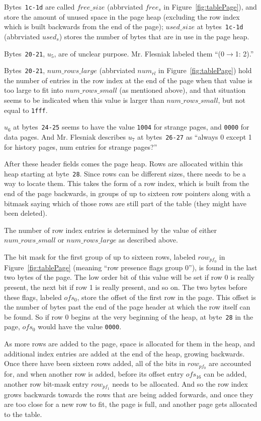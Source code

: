 \documentclass[11pt]{article}
\begin{document}
Bytes~{\tt 1c-1d} are called $free\_size$ (abbrviated $free_s$ in
Figure~\ref{fig:tablePage}), and store the amount of unused space in
the page heap (excluding the row index which is built backwards from
the end of the page); $used\_size$ at bytes~{\tt 1c-1d} (abbrviated
$used_s$) stores the number of bytes that are in use in the page heap.

Bytes~{\tt 20-21}, $u_5$, are of unclear purpose. Mr. Flesniak labeled
them ``(0$\rightarrow$1: 2).''

Bytes~{\tt 20-21}, $num\_rows\_large$ (abbrviated $num_{rl}$ in
Figure~\ref{fig:tablePage}) hold the number of entries in the row
index at the end of the page when that value is too large to fit into
$num\_rows\_small$ (as mentioned above), and that situation seems to
be indicated when this value is larger than $num\_rows\_small$, but
not equal to {\tt 1fff}.

$u_6$ at bytes~{\tt 24-25} seems to have the value {\tt 1004} for
strange pages, and {\tt 0000} for data pages. And Mr. Flesniak
describes $u_7$ at bytes~{\tt 26-27} as ``always 0 except 1 for
history pages, num entries for strange pages?''

After these header fields comes the page heap. Rows are allocated
within this heap starting at byte~{\tt 28}. Since rows can be
different sizes, there needs to be a way to locate them. This takes
the form of a row index, which is built from the end of the page
backwards, in groups of up to sixteen row pointers along with a
bitmask saying which of those rows are still part of the table (they
might have been deleted).

The number of row index entries is determined by the value of either
$num\_rows\_small$ or $num\_rows\_large$ as described above.

The bit mask for the first group of up to sixteen rows, labeled
$row_{pf_0}$ in Figure~\ref{fig:tablePage} (meaning ``row presence
flags group 0''), is found in the last two bytes of the page. The low
order bit of this value will be set if row 0 is really present, the
next bit if row 1 is really present, and so on. The two bytes before
these flags, labeled $ofs_0$, store the offset of the first row in the
page. This offset is the number of bytes past the end of the page
header at which the row itself can be found. So if row 0 begins at the
very beginning of the heap, at byte~{\tt 28} in the page, $ofs_0$
would have the value {\tt 0000}.

As more rows are added to the page, space is allocated for them in the
heap, and additional index entries are added at the end of the heap,
growing backwards. Once there have been sixteen rows added, all of the
bits in $row_{pf_0}$ are accounted for, and when another row is added,
before its offset entry $ofs_{16}$ can be added, another row bit-mask
entry $row_{pf_1}$ needs to be allocated. And so the row index grows
backwards towards the rows that are being added forwards, and once
they are too close for a new row to fit, the page is full, and another
page gets allocated to the table.
\end{document}
